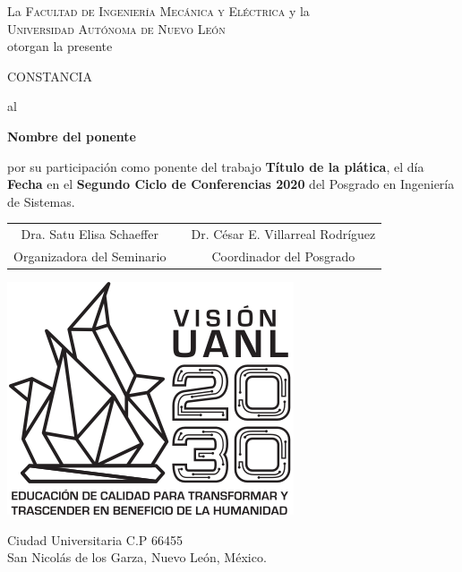 \documentclass{article}
\def\titulo{Título de la plática}
\def\ponente{Nombre del ponente}
\def\pisis{Posgrado en Ingeniería de Sistemas}
\def\seminario{Segundo Ciclo de Conferencias 2020}
\def\fecha{Fecha}
\def\organizador{Dra. Satu Elisa Schaeffer}
\def\coordinador{Dr. César E. Villarreal Rodríguez}
\def\uanl{\textsc{Universidad Autónoma de Nuevo León} }
\def\fime{\textsc{Facultad de Ingeniería Mecánica y Eléctrica} }
\begin{document}
\vspace*{1.2 cm}
\begin{center}
\begin{Large}
La \fime y la \\ \uanl \\
otorgan la presente \\ \vspace*{0.2cm}
\end{Large}

\vspace*{0.5cm}
\begin{huge}
 \textsc{CONSTANCIA} 
\end{huge}
\vspace*{0.7cm}
 

 \begin{Large} al \end{Large} 
\begin{LARGE}
\textbf{\ponente} 
\end{LARGE}

\vspace*{0.5cm}
\begin{Large}
por su participación como ponente del trabajo \textbf{\titulo}, el día \textbf{\fecha} en el \textbf{\seminario} del \pisis. %


\vspace*{3.7 cm}
\begin{tabular}{p{37mm}p{21mm}p{12mm}p{21mm}p{37mm}}	
	\cline{1-2} \cline{4-5}
	\multicolumn{2}{c}{\organizador} & & \multicolumn{2}{c}{\coordinador} \\
	\multicolumn{2}{c}{Organizadora del Seminario}   & & \multicolumn{2}{c}{Coordinador del Posgrado}   \\[17mm]
\end{tabular}
\end{Large}
\end{center}

\vspace*{-1.5cm}
\begin{flushleft}
\includegraphics[scale=0.2]{vision.png}
\end{flushleft}

\vspace*{-2cm}
\begin{flushright}
Ciudad Universitaria C.P 66455\\
San Nicolás de los Garza, Nuevo León, México.
\end{flushright}
\end{document}
